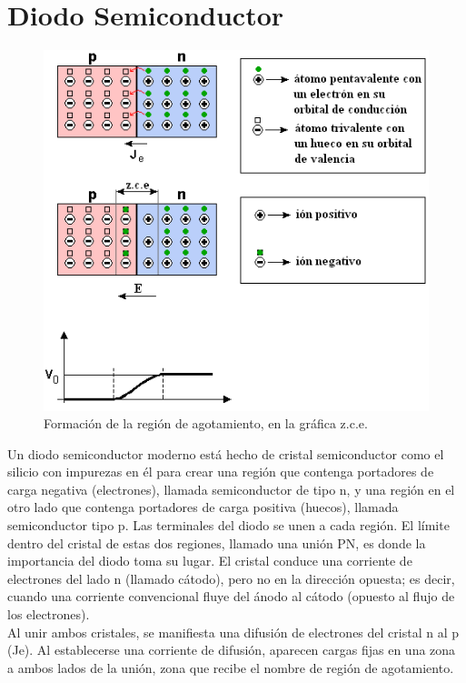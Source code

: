 \documentclass{article}
\begin{document}
\section{Diodo Semiconductor}

\begin{figure}[h!]
\centering
\includegraphics[scale=0.5]{DiodoSem.png}
\caption{Formación de la región de agotamiento, en la gráfica z.c.e.}
\label{fig:diodoSem}
\end{figure}

Un diodo semiconductor moderno está hecho de cristal semiconductor como el silicio con impurezas en él para crear una región que contenga portadores de carga negativa (electrones), llamada semiconductor de tipo n, y una región en el otro lado que contenga portadores de carga positiva (huecos), llamada semiconductor tipo p. Las terminales del diodo se unen a cada región. El límite dentro del cristal de estas dos regiones, llamado una unión PN, es donde la importancia del diodo toma su lugar. El cristal conduce una corriente de electrones del lado n (llamado cátodo), pero no en la dirección opuesta; es decir, cuando una corriente convencional fluye del ánodo al cátodo (opuesto al flujo de los electrones).\citep{diodoWiki}\\

Al unir ambos cristales, se manifiesta una difusión de electrones del cristal n al p (Je). Al establecerse una corriente de difusión, aparecen cargas fijas en una zona a ambos lados de la unión, zona que recibe el nombre de región de agotamiento.\citep{diodoWiki}\\
\end{document}
